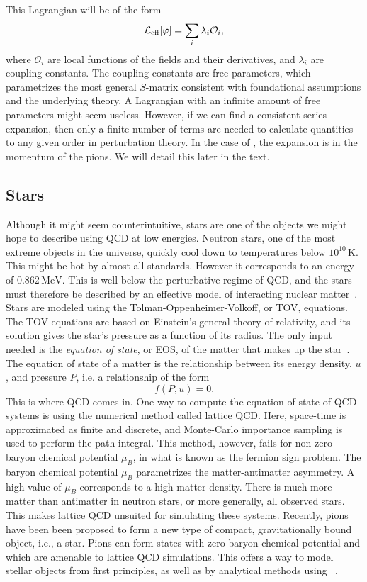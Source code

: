 This Lagrangian will be of the form
\begin{equation}
    \mathcal{L}_\text{eff}[\varphi] = \sum_i \lambda_i \mathcal O_i,
\end{equation}
where $\mathcal O_i$ are local functions of the fields and their derivatives, and $\lambda_i$ are coupling constants.
The coupling constants are free parameters, which parametrizes the most general $S$-matrix consistent with foundational assumptions and the underlying theory.
A Lagrangian with an infinite amount of free parameters might seem useless.
However, if we can find a consistent series expansion, then only a finite number of terms are needed to calculate quantities to any given order in perturbation theory.
In the case of \chpt, the expansion is in the momentum of the pions.
We will detail this later in the text.


\subsection*{Stars}

Although it might seem counterintuitive, stars are one of the objects we might hope to describe using QCD at low energies.
Neutron stars, one of the most extreme objects in the universe, quickly cool down to temperatures below $10^{10} \, \text{K}$.
This might be hot by almost all standards.
However it corresponds to an energy of $0.862 \, \text{MeV}$.
This is well below the perturbative regime of QCD, and the stars must therefore be described by an effective model of interacting nuclear matter~\cite{glendenning:compcat_stars,from_hadrons_to_quarks}.
Stars are modeled using the Tolman-Oppenheimer-Volkoff, or TOV, equations.
The TOV equations are based on Einstein's general theory of relativity, and its solution gives the star's pressure as a function of its radius.
The only input needed is the \emph{equation of state}, or EOS, of the matter that makes up the star~\cite{Carroll:space-time}.
The equation of state of a matter is the relationship between its energy density, $u$, and pressure $P$, i.e. a relationship of the form
\begin{equation}
    f(P, u) = 0.
\end{equation}
This is where QCD comes in.
One way to compute the equation of state of QCD systems is using the numerical method called lattice QCD.
Here, space-time is approximated as finite and discrete, and Monte-Carlo importance sampling is used to perform the path integral.
This method, however, fails for non-zero baryon chemical potential $\mu_B$, in what is known as the fermion sign problem.
The baryon chemical potential $\mu_B$ parametrizes the matter-antimatter asymmetry.
A high value of $\mu_B$ corresponds to a high matter density.
There is much more matter than antimatter in neutron stars, or more generally, all observed stars.
This makes lattice QCD unsuited for simulating these systems.
Recently, pions have been been proposed to form a new type of compact, gravitationally bound object, i.e., a star.
Pions can form states with zero baryon chemical potential and which are amenable to lattice QCD simulations.
This offers a way to model stellar objects from first principles, as well as by analytical methods using \chpt~\cite{new_clas_of_compact_stars,andersen:bose_einstein}.

